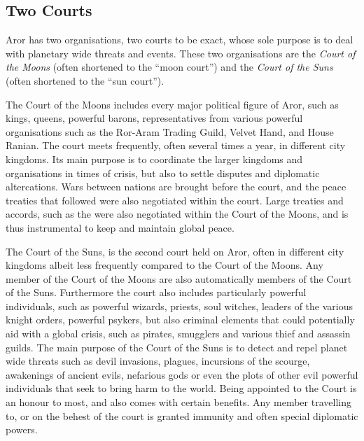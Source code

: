 \subsection{Two Courts}
\label{sec:Two Courts}

Aror has two organisations, two courts to be exact, whose sole purpose is to
deal with planetary wide threats and events. These two organisations are the
\emph{Court of the Moons} (often shortened to the ``moon court'') and the
\emph{Court of the Suns} (often shortened to the ``sun court'').

The Court of the Moons includes every major political figure of Aror, such
as kings, queens, powerful barons, representatives from various powerful
organisations such as the Ror-Aram Trading Guild, Velvet Hand, and House Ranian.
The court meets frequently, often several times a year, in different city
kingdoms. Its main purpose is to coordinate the larger kingdoms and
organisations in times of crisis, but also to settle disputes and diplomatic
altercations. Wars between nations are brought before the court, and the
peace treaties that followed were also negotiated within the court. Large
treaties and accords, such as the  were also
negotiated within the Court of the Moons, and is thus instrumental to keep
and maintain global peace.

The Court of the Suns, is the second court held on Aror, often in different
city kingdoms albeit less frequently compared to the Court of the Moons. Any
member of the Court of the Moons are also automatically members of the Court
of the Suns. Furthermore the court also includes particularly powerful
individuals, such as powerful wizards, priests, soul witches, leaders of the
various knight orders, powerful psykers, but also criminal elements that could
potentially aid with a global crisis, such as pirates, smugglers and various
thief and assassin guilds. The main purpose of the Court of the Suns is to
detect and repel planet wide threats such as devil invasions, plagues,
incursions of the scourge, awakenings of ancient evils, nefarious gods or even
the plots of other evil powerful individuals that seek to bring harm to the
world. Being appointed to the Court is an honour to most, and also comes with
certain benefits. Any member travelling to, or on the behest of the court is
granted immunity and often special diplomatic powers.

